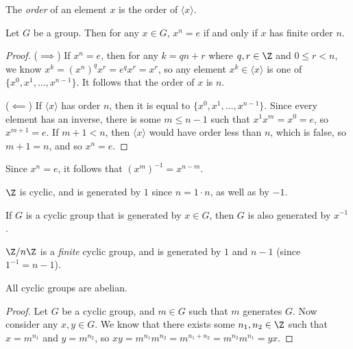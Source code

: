 \documentclass[12pt]{article}
\begin{document}
\begin{defn}
    The \emph{order} of an element $x$ is the order of $\langle{x}\rangle$.
\end{defn}

\begin{prop}
    Let $G$ be a group. Then for any $x \in G$, $x^n = e$ if and only if $x$ has finite order $n$.
\end{prop}

\begin{proof}\proofbreak
    ($\implies$) If $x^n = e$, then for any $k = qn + r$ where $q, r \in \Z$ and $0 \leq r < n$, we know $x^k = (x^n)^qx^r = e^qx^r = x^r$, so any element $x^k \in \langle{x}\rangle$ is one of $\{x^0, x^1, \ldots, x^{n-1}\}$. It follows that the order of $x$ is $n$.

    ($\impliedby$) If $\langle{x}\rangle$ has order $n$, then it is equal to $\{x^0, x^1, \ldots, x^{n-1}\}$. Since every element has an inverse, there is some $m \leq n-1$ such that $x^1x^m = x^0 = e$, so $x^{m+1} = e$. If $m+1 < n$, then $\langle{x}\rangle$ would have order less than $n$, which is false, so $m+1 = n$, and so $x^n = e$.
\end{proof}

\begin{cor}
    Since $x^n = e$, it follows that $\left(x^m\right)^{-1} = x^{n-m}$.
\end{cor}

\begin{exmp}
    $\Z$ is cyclic, and is generated by $1$ since $n = 1 \cdot n$, as well as by $-1$.
\end{exmp}

\begin{rmk}
    If $G$ is a cyclic group that is generated by $x \in G$, then $G$ is also generated by $x^{-1}$.
\end{rmk}

\begin{exmp}
    $\Z/n\Z$ is a \emph{finite} cyclic group, and is generated by $1$ and $n-1$ (since $1^{-1} = n-1$).
\end{exmp}

\begin{prop}
    All cyclic groups are abelian.
\end{prop}

\begin{proof}
    Let $G$ be a cyclic group, and $m \in G$ such that $m$ generates $G$. Now consider any $x, y \in G$. We know that there exists some $n_1, n_2 \in \Z$ such that $x = m^{n_1}$ and $y = m^{n_2}$, so $xy = m^{n_1}m^{n_2} = m^{n_1 + n_2} = m^{n_2}m^{n_1} = yx$.
\end{proof}
\end{document}
